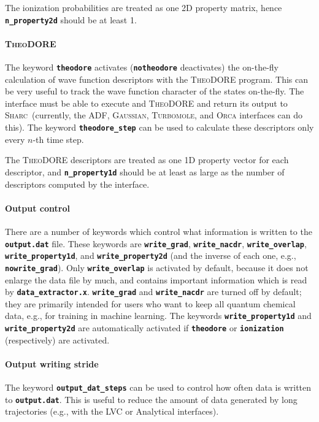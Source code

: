 \documentclass[a4paper,10pt,DIV=15,openany]{scrbook}
\newcommand{\sharc}{\textsc{Sharc}}
\newcommand{\ttt}[1]{\textbf{\texttt{#1}}}
\begin{document}
The ionization probabilities are treated as one 2D property matrix, hence \ttt{n\_property2d} should be at least 1.

\paragraph{\textsc{TheoDORE}}

The keyword \ttt{theodore} activates (\ttt{notheodore} deactivates) the on-the-fly calculation of wave function descriptors with the \textsc{TheoDORE} program. This can be very useful to track the wave function character of the states on-the-fly.
The interface must be able to execute and \textsc{TheoDORE} and return its output to \sharc\ (currently, the ADF, \textsc{Gaussian}, \textsc{Turbomole}, and \textsc{Orca} interfaces can do this). The keyword \ttt{theodore\_step} can be used to calculate these descriptors only every $n$-th time step. 

The \textsc{TheoDORE} descriptors are treated as one 1D property vector for each descriptor, and \ttt{n\_property1d} should be at least as large as the number of descriptors computed by the interface.

\paragraph{Output control}

There are a number of keywords which control what information is written to the \ttt{output.dat} file.
These keywords are \ttt{write\_grad}, \ttt{write\_nacdr}, \ttt{write\_overlap}, \ttt{write\_property1d}, and \ttt{write\_property2d} (and the inverse of each one, e.g., \ttt{nowrite\_grad}).
Only \ttt{write\_overlap} is activated by default, because it does not enlarge the data file by much, and contains important information which is read by \ttt{data\_extractor.x}.
\ttt{write\_grad} and \ttt{write\_nacdr} are turned off by default; they are primarily intended for users who want to keep all quantum chemical data, e.g., for training in machine learning.
The keywords \ttt{write\_property1d} and \ttt{write\_property2d} are automatically activated if \ttt{theodore} or \ttt{ionization} (respectively) are activated.

\paragraph{Output writing stride}

The keyword \ttt{output\_dat\_steps} can be used to control how often data is written to \ttt{output.dat}.
This is useful to reduce the amount of data generated by long trajectories (e.g., with the LVC or Analytical interfaces).
\end{document}
